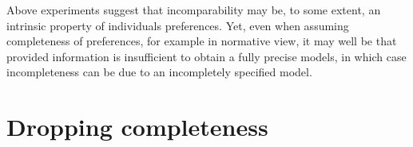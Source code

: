 \documentclass[french, english]{llncs}
\begin{document}
	
	
	Above experiments suggest that incomparability may be, to some extent, an intrinsic property of individuals preferences. Yet, even when assuming completeness of preferences, for example in normative view, it may well be that provided information is insufficient to obtain a fully precise models, in which case incompleteness can be due to an incompletely specified model. 
	
	\section{Dropping completeness}\label{sec:incomp}
\end{document}
